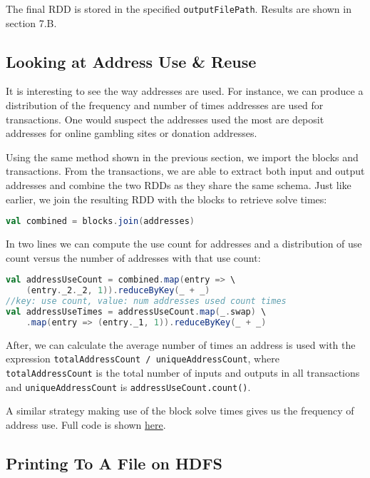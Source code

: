 \documentclass[9pt,twocolumn,twoside]{idsi}
\begin{document}
The final RDD is stored in the specified \lstinline{outputFilePath}. Results are shown in section 7.B.

\subsection{Looking at Address Use \& Reuse}
It is interesting to see the way addresses are used. For instance, we can produce a distribution of the frequency and number of times addresses are used for transactions. One would suspect the addresses used the most are deposit addresses for online gambling sites or donation addresses.

Using the same method shown in the previous section, we import the blocks and transactions. From the transactions, we are able to extract both input and output addresses and combine the two RDDs as they share the same schema. Just like earlier, we join the resulting RDD with the blocks to retrieve solve times:

\begin{lstlisting}[language=Scala]
val combined = blocks.join(addresses)
\end{lstlisting}

In two lines we can compute the use count for addresses and a distribution of use count versus the number of addresses with that use count:

\begin{lstlisting}[language=Scala]
val addressUseCount = combined.map(entry => \
    (entry._2._2, 1)).reduceByKey(_ + _)
//key: use count, value: num addresses used count times
val addressUseTimes = addressUseCount.map(_.swap) \
    .map(entry => (entry._1, 1)).reduceByKey(_ + _)
\end{lstlisting}

After, we can calculate the average number of times an address is used with the expression \lstinline{totalAddressCount / uniqueAddressCount}, where \lstinline{totalAddressCount} is the total number of inputs and outputs in all transactions and \lstinline{uniqueAddressCount} is \lstinline{addressUseCount.count()}.

A similar strategy making use of the block solve times gives us the frequency of address use. Full code is shown \href{https://google.com}{here}.

\subsection{Printing To A File on HDFS}
\end{document}
